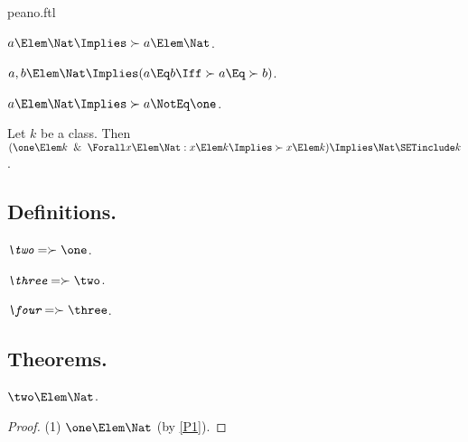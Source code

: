 \documentclass{stex}
\begin{document}
\begin{smodule}{peano.ftl}
\begin{forthel}
  \begin{axiom*}[title=6,id=P6]
    $a \Elem \Nat \Implies \succ{a} \Elem \Nat$.
  \end{axiom*}
  
  \begin{axiom*}[title=7,id=P7]
    $a,b \Elem \Nat \Implies (a \Eq b \Iff \succ{a} \Eq \succ{b})$.
  \end{axiom*}
  
  \begin{axiom*}[title=8,id=P8]
    $a \Elem \Nat \Implies \succ{a} \NotEq \one$.
  \end{axiom*}
  
  \begin{axiom*}[title=9,id=P9]
    Let $k$ be a class.
    Then $(\one \Elem k \And \Forall x \Elem \Nat: x \Elem k \Implies \succ{x} \Elem k) \Implies \Nat \SETinclude k$.
  \end{axiom*}
\end{forthel}


\subsection{Definitions.}

\begin{forthel}
  \begin{definition*}[title=10.i,id=P10_1]
    $\emph{\two} = \succ{\one}$.
  \end{definition*}

  \begin{definition*}[title=10.ii,id=P10_2]
    $\emph{\three} = \succ{\two}$.
  \end{definition*}
  
  \begin{definition*}[title=10.iii,id=P10_3]
    $\emph{\four} = \succ{\three}$.
  \end{definition*}
\end{forthel}


\subsection{Theorems.}

\begin{forthel}
  \begin{theorem*}[title=11,id=P11]
    $\two \Elem \Nat$.
  \end{theorem*}
  \begin{proof}
    (1) $\one \Elem \Nat$ (by \ref{P1}).


\end{proof}
\end{forthel}
\end{smodule}
\end{document}
